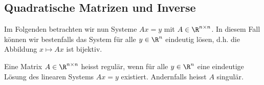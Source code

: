 \documentclass[letterpaper,10pt,english]{jupyterBook}
\begin{document}
\subsection{Quadratische Matrizen und Inverse}
\label{\detokenize{vektorraeume/LGS:quadratische-matrizen-und-inverse}}
Im Folgenden betrachten wir nun Systeme \(Ax = y\) mit \(A \in \R^{n \times n}\). In diesem Fall können wir bestenfalls das System für alle \(y \in \R^n\) eindeutig lösen, d.h. die Abbildung \(x \mapsto Ax\) ist bijektiv.
\label{vektorraeume/LGS:definition-8}
\begin{definition}{}{}



Eine Matrix \(A \in \R^{n \times n}\) heisst regulär, wenn für alle \(y \in \R^n\) eine eindeutige Lösung des linearen Systems \(Ax=y\) existiert. Andernfalls heisst \(A\) singulär.
\end{definition}
\end{document}
